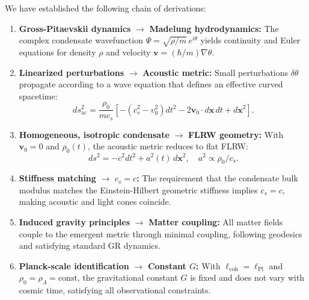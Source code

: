 We have established the following chain of derivations:

\begin{enumerate}[leftmargin=2.2em]
    \item \textbf{Gross-Pitaevskii dynamics} $\to$ \textbf{Madelung hydrodynamics:} The complex condensate wavefunction $\Psi = \sqrt{\rho/m} \, e^{i\theta}$ yields continuity and Euler equations for density $\rho$ and velocity $\mathbf{v} = (\hbar/m)\nabla\theta$.

    \item \textbf{Linearized perturbations} $\to$ \textbf{Acoustic metric:} Small perturbations $\delta\theta$ propagate according to a wave equation that defines an effective curved spacetime:
    \begin{equation}
    ds_{\mathrm{ac}}^2 = \frac{\rho_0}{m c_s} \left[ -(c_s^2 - v_0^2) dt^2 - 2\mathbf{v}_0 \cdot d\mathbf{x} \, dt + d\mathbf{x}^2 \right].
    \end{equation}

    \item \textbf{Homogeneous, isotropic condensate} $\to$ \textbf{FLRW geometry:} With $\mathbf{v}_0 = 0$ and $\rho_0(t)$, the acoustic metric reduces to flat FLRW:
    \begin{equation}
    ds^2 = -c^2 dt^2 + a^2(t) \, d\mathbf{x}^2, \quad a^2 \propto \rho_0/c_s.
    \end{equation}

    \item \textbf{Stiffness matching} $\to$ \textbf{$c_s = c$:} The requirement that the condensate bulk modulus matches the Einstein-Hilbert geometric stiffness implies $c_s = c$, making acoustic and light cones coincide.

    \item \textbf{Induced gravity principles} $\to$ \textbf{Matter coupling:} All matter fields couple to the emergent metric through minimal coupling, following geodesics and satisfying standard GR dynamics.

    \item \textbf{Planck-scale identification} $\to$ \textbf{Constant $G$:} With $\ell_{\mathrm{coh}} = \ell_{\mathrm{Pl}}$ and $\rho_0 = \rho_\Lambda = \text{const}$, the gravitational constant $G$ is fixed and does not vary with cosmic time, satisfying all observational constraints.
\end{enumerate}

